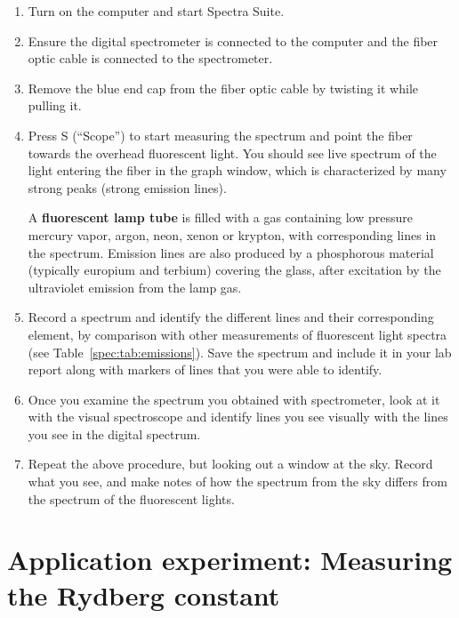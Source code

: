 \begin{enumerate}
	\item Turn on the computer and start Spectra Suite.
	
	\item Ensure the digital spectrometer is connected to the computer and the fiber optic cable is connected to the spectrometer.
	
	\item Remove the blue end cap from the fiber optic cable by twisting it while pulling it.
	
	\item Press S (``Scope'') to start measuring the spectrum %
	and point the fiber towards the overhead fluorescent light. You should see live spectrum of the light
	entering the fiber in the graph window, which is characterized by many strong peaks
	(strong emission lines).
	
\begin{framed}
	A \textbf{fluorescent lamp tube} is filled with a gas containing low pressure mercury vapor,
		argon, neon, xenon or krypton, with corresponding lines in the spectrum. Emission lines
		are also produced by a phosphorous material (typically europium and terbium) covering
		the glass, after excitation by the ultraviolet emission from the lamp gas.
\end{framed}

	\item Record a spectrum and identify the different lines and their corresponding element, by
	comparison with other measurements of fluorescent light spectra (see Table~\ref{spec:tab:emissions}). Save the spectrum and
	include it in your lab report along with markers of lines that you were able to identify.
	
	\item Once you examine the spectrum you obtained with spectrometer, look at it with the visual
	spectroscope and identify lines you see visually with the lines you see in the digital
	spectrum.
	
	\item Repeat the above procedure, but looking out a window at the sky. Record what you see,
	and make notes of how the spectrum from the sky differs from the spectrum of the
	fluorescent lights.

\end{enumerate}

\section{Application experiment: Measuring the Rydberg constant}\label{spec:sec:rydberg}

